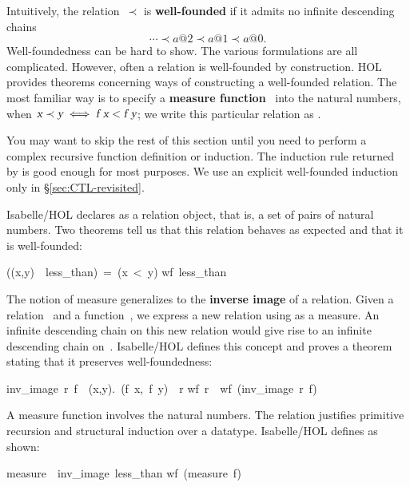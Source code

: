 Intuitively, the relation~$\prec$ is \textbf{well-founded} if it admits no
infinite  descending chains
\[ \cdots \prec a@2 \prec a@1 \prec a@0. \]
Well-foundedness can be hard to show. The various 
formulations are all complicated.  However,  often a relation
is well-founded by construction.  HOL provides
theorems concerning ways of constructing  a well-founded relation.  The
most familiar way is to specify a 
\textbf{measure function}~ into
the natural numbers, when $\emph{\sl x}\prec \emph{\sl y}\iff \emph{\sl f x} < \emph{\sl f y}$;
we write this particular relation as
.

\begin{warn}
You may want to skip the rest of this section until you need to perform a
complex recursive function definition or induction.  The induction rule
returned by
 is good enough for most purposes.  We use an explicit
well-founded induction only in {\S}\ref{sec:CTL-revisited}.
\end{warn}

Isabelle/HOL declares  as a relation object, 
that is, a set of pairs of natural numbers. Two theorems tell us that this
relation  behaves as expected and that it is well-founded: 
\begin{isabelle}
((x,y)\ \isasymin\ less_than)\ =\ (x\ <\ y)
\isanewline
wf\ less_than
\end{isabelle}

The notion of measure generalizes to the 
\textbf{inverse image} of
a relation. Given a relation~ and a function~, we express  a
new relation using  as a measure.  An infinite descending chain on
this new relation would give rise to an infinite descending chain
on~.  Isabelle/HOL defines this concept and proves a
theorem stating that it preserves well-foundedness: 
\begin{isabelle}
inv_image\ r\ f\ \isasymequiv\ \isacharbraceleft(x,y).\ (f\ x,\ f\ y)\
\isasymin\ r\isacharbraceright
{}\isanewline
wf\ r\ \isasymLongrightarrow\ wf\ (inv_image\ r\ f)
\end{isabelle}

A measure function involves the natural numbers.  The relation \isa{measure
size} justifies primitive recursion and structural induction over a
datatype.  Isabelle/HOL defines
 as shown: 
\begin{isabelle}
measure\ \isasymequiv\ inv_image\ less_than%
\isanewline
wf\ (measure\ f)
\end{isabelle}

